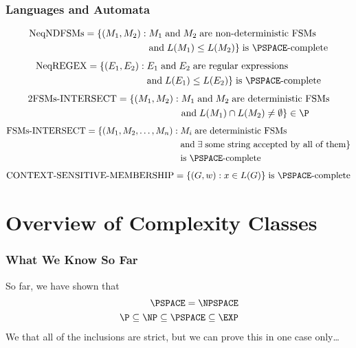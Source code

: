 \documentclass[a4paper]{report}
\newcommand{\bookref}[3]{\marginpar{\faBook{}~#1\\Chapter #2\\Section #3}}
\theoremstyle{definition}
\begin{document}
\section{Languages and Automata}
\bookref{ER}{29}{29.3.3}
\vspace{-0.3cm}%
\begin{align*}
\text{NeqNDFSMs} = \{ (M_1, M_2) : &\;M_1 \;\text{and}\; M_2 \;\text{are non-deterministic FSMs} \\ &\;\text{and} \; L(M_1) \leq L(M_2) \} \;\text{is \PSPACE-complete}
\end{align*}
%
\vspace{-0.3cm}%
\begin{align*}
\text{NeqREGEX} = \{ (E_1, E_2) : &\;E_1 \;\text{and}\; E_2 \;\text{are regular expressions} \\ &\;\text{and} \; L(E_1) \leq L(E_2) \} \;\text{is \PSPACE-complete}
\end{align*}
%
\begin{align*}
\text{2FSMs-INTERSECT} = \{ (M_1, M_2) : &\;M_1 \;\text{and}\; M_2 \;\text{are deterministic FSMs} \\ &\;\text{and} \; L(M_1) \cap L(M_2) \neq \emptyset \} \in \P
\end{align*}
%
\begin{align*}
\text{FSMs-INTERSECT} = \{ (M_1, M_2, \dots{}, M_n) : &\;M_i \;\text{are deterministic FSMs} \\ &\;\text{and} \; \exists \;\text{some string accepted by all of them} \}\\ & \;\text{is \PSPACE-complete}
\end{align*}
%
\begin{align*}
\text{CONTEXT-SENSITIVE-MEMBERSHIP} = \{ (G, w) : x \in L(G) \} \;\text{is \PSPACE-complete}
\end{align*}

\part{Overview of Complexity Classes}

\section{What We Know So Far}
So far, we have shown that
\begin{align*}
\PSPACE = \NPSPACE\\
\P \subseteq \NP \subseteq \PSPACE \subseteq \EXP
\end{align*}
%
We  that all of the inclusions are strict, but we can prove this in one case only\dots{}
\end{document}
